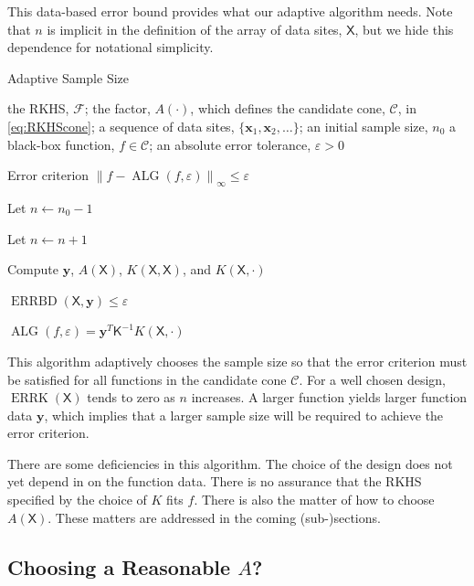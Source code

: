 \documentclass[]{mcom-l}
\theoremstyle{remark}
\DeclareMathOperator{\ALG}{ALG}
\DeclareMathOperator{\errK}{ERRK}
\DeclareMathOperator{\errBd}{ERRBD}
\newcommand{\mK}{\mathsf{K}}
\newcommand{\mX}{\mathsf{X}}
\newcommand{\bx}{{\boldsymbol{x}}}
\newcommand{\by}{{\boldsymbol{y}}}
\newcommand{\cc}{\mathcal{C}}
\newcommand{\calf}{{\mathcal{F}}}
\newcommand{\norm}[2][{}]{\ensuremath{\left \lVert #2 \right \rVert}_{#1}}
\begin{document}
This data-based error bound provides what  our adaptive algorithm needs.  Note that $n$ is implicit in the definition of the array of data sites, $\mX$, but we hide this dependence for notational simplicity.

\begin{algorithm}[H]
\caption{Adaptive Sample Size \label{alg:basicadapt}}
	\begin{algorithmic}
	\PARAM the RKHS, $\calf$; the factor, $A(\cdot)$, which defines  the candidate cone, $\cc$, in \eqref{eq:RKHScone};  a sequence of data sites, $\{\bx_1, \bx_2, \ldots \}$; an initial sample size, $n_0$
	\INPUT a black-box function, $f \in \cc$; an absolute error tolerance, $\varepsilon>0$

    \Ensure Error criterion $\norm[\infty]{f - \ALG(f,\varepsilon)} \le \varepsilon$

   \State Let $n \leftarrow n_0 -1$

\Repeat

\State Let $n \leftarrow n + 1$

\State Compute $\by$, $A(\mX)$, $K(\mX,\mX)$, and $K(\mX,\cdot)$

\Until $\errBd(\mX,\by) \le \varepsilon$

\RETURN $\ALG(f,\varepsilon) = \by^T \mK^{-1} K(\mX,\cdot)$

\end{algorithmic}
\end{algorithm}

This algorithm adaptively chooses the sample size so that the error criterion must be satisfied for all functions in the candidate cone $\cc$.  For a well chosen design, $\errK(\mX)$ tends to zero as $n$ increases.  A larger function yields larger function data $\by$, which implies that a larger sample size will be required to achieve the error criterion.

There are some deficiencies in this algorithm.  The choice of the design does not yet depend in on the function data.  There is no assurance that the RKHS specified by the choice of $K$ fits $f$.  There is also the matter of how to choose $A(\mX)$.  These matters are addressed in the coming (sub-)sections.


\subsection{Choosing a Reasonable $A$?}
\end{document}
